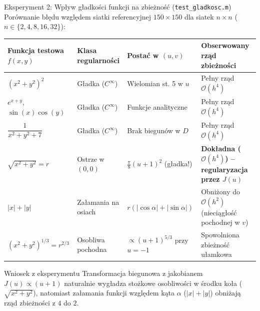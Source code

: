 \documentclass[aspectratio=169, 10pt, xcolor={table}]{beamer}
\begin{document}
\begin{frame}{Eksperyment 2: Wpływ gładkości funkcji na zbieżność (\texttt{test\_gladkosc.m})}
  Porównanie błędu względem siatki referencyjnej $150 \times 150$ dla siatek $n \times n$ ($n \in \{2, 4, 8, 16, 32\}$):

  \vspace{0.15cm}
  \begin{table}
    \centering
    \small
    \begin{tabular}{@{} l l l l @{}}
      \toprule
      \textbf{Funkcja testowa $f(x,y)$} & \textbf{Klasa regularności} & \textbf{Postać w $(u, v)$} & \textbf{Obserwowany rząd zbieżności} \\
      \midrule
      $(x^2 + y^2)^2$ & Gładka ($C^\infty$) & Wielomian st. 5 w $u$ & Pełny rząd $\mathcal{O}(h^4)$ \\
      $e^{x+y}$, $\sin(x)\cos(y)$ & Gładka ($C^\infty$) & Funkcje analityczne & Pełny rząd $\mathcal{O}(h^4)$ \\
      $\dfrac{1}{x^2 + y^2 + 7}$ & Gładka ($C^\infty$) & Brak biegunów w $D$ & Pełny rząd $\mathcal{O}(h^4)$ \\
      \midrule
      \rowcolor{RowHighlight}
      $\sqrt{x^2 + y^2} = r$ & Ostrze w $(0,0)$ & $\frac{\pi}{8}(u+1)^2$ (gładka!) & \textbf{Dokładna ($\mathcal{O}(h^4)$) -- regularyzacja przez $J(u)$} \\
      $|x| + |y|$ & Załamania na osiach & $r(|\cos\alpha|+|\sin\alpha|)$ & Obniżony do $\mathcal{O}(h^2)$ (nieciągłość pochodnej w $v$) \\
      $(x^2 + y^2)^{1/3} = r^{2/3}$ & Osobliwa pochodna & $\propto (u+1)^{5/3}$ przy $u=-1$ & Spowolniona zbieżność ułamkowa \\
      \bottomrule
    \end{tabular}
  \end{table}

  \begin{block}{Wniosek z eksperymentu}
    Transformacja biegunowa z jakobianem $J(u) \propto (u+1)$ naturalnie wygładza stożkowe osobliwości w środku koła ($\sqrt{x^2+y^2}$), natomiast załamania funkcji względem kąta $\alpha$ ($|x|+|y|$) obniżają rząd zbieżności z $4$ do $2$.
  \end{block}
\end{frame}
\end{document}

